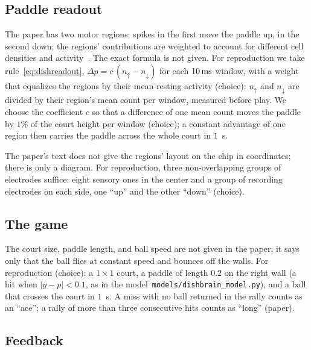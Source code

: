 \subsection*{Paddle readout}

The paper has two motor regions: spikes in the first move the paddle up, in the second down; the regions' contributions are weighted to account for different cell densities and activity~\cite{Kagan2022}. The exact formula is not given. For reproduction we take rule~\eqref{eq:dishreadout}, $\Delta p=c\,(n_\uparrow-n_\downarrow)$ for each $10\,\text{ms}$ window, with a weight that equalizes the regions by their mean resting activity (choice): $n_\uparrow$ and $n_\downarrow$ are divided by their region's mean count per window, measured before play. We choose the coefficient $c$ so that a difference of one mean count moves the paddle by $1\%$ of the court height per window (choice); a constant advantage of one region then carries the paddle across the whole court in $1$~s.

The paper's text does not give the regions' layout on the chip in coordinates; there is only a diagram. For reproduction, three non-overlapping groups of electrodes suffice: eight sensory ones in the center and a group of recording electrodes on each side, one ``up'' and the other ``down'' (choice).

\subsection*{The game}

The court size, paddle length, and ball speed are not given in the paper; it says only that the ball flies at constant speed and bounces off the walls. For reproduction (choice): a $1\times1$ court, a paddle of length $0.2$ on the right wall (a hit when $|y-p|<0.1$, as in the model~\texttt{models/dishbrain\_model.py}), and a ball that crosses the court in $1$~s. A miss with no ball returned in the rally counts as an ``ace''; a rally of more than three consecutive hits counts as ``long'' (paper).

\subsection*{Feedback}

